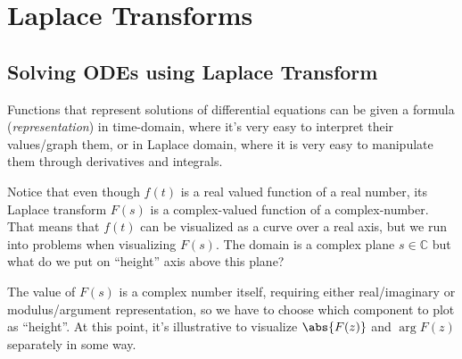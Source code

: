 \chapter{Laplace Transforms}

\section{Solving ODEs using Laplace Transform}

\begin{weekintro}
  \begin{fullwidth}
  Functions that represent solutions of differential equations can be given a formula (\emph{representation}) in time-domain, where it's very easy to interpret their values/graph them, or in  Laplace domain, where it is very easy to manipulate them through derivatives and integrals.

  Notice that even though \(f(t)\) is a real valued function of a real number, its Laplace transform \(F(s)\) is a complex-valued function of a complex-number. That means that \(f(t)\) can be visualized as a curve over a real axis, but we run into problems when visualizing \(F(s)\). The domain is a complex plane \(s \in \mathbb{C}\) but what do we put on ``height'' axis above this plane?

  The value of \(F(s)\) is a complex number itself, requiring either real/imaginary or modulus/argument representation, so we have to choose which component to plot as ``height''. At this point, it's illustrative to visualize \(\abs{F(z)}\) and \(\arg F(z)\) separately in some way.


\end{fullwidth}
\end{weekintro}
